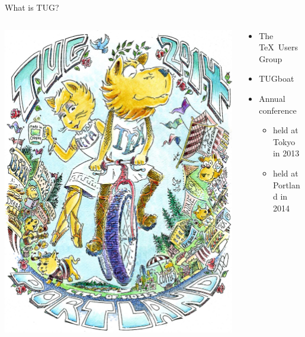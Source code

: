 \documentclass[17pt,dvipdfmx]{beamer}
\begin{document}
\begin{frame}[t]{What is TUG?}
  \bfseries\rmfamily
  \begin{columns}[t]
    \begin{column}{.4\textwidth}
      \vfill
      \hfill\includegraphics[width=.9\textwidth]{tug2014-color.jpg}
    \end{column}
    \begin{column}{.7\textwidth}
    \begin{itemize}
      \item  The \TeX\ Users Group \\
      \item  TUGboat \\
      \item  Annual conference \\
      \begin{itemize}
        \item held at Tokyo in 2013
        \item held at Portland in 2014
      \end{itemize}
    \end{itemize}
    \vfill
    \end{column}
  \end{columns}
\end{frame}
\end{document}
